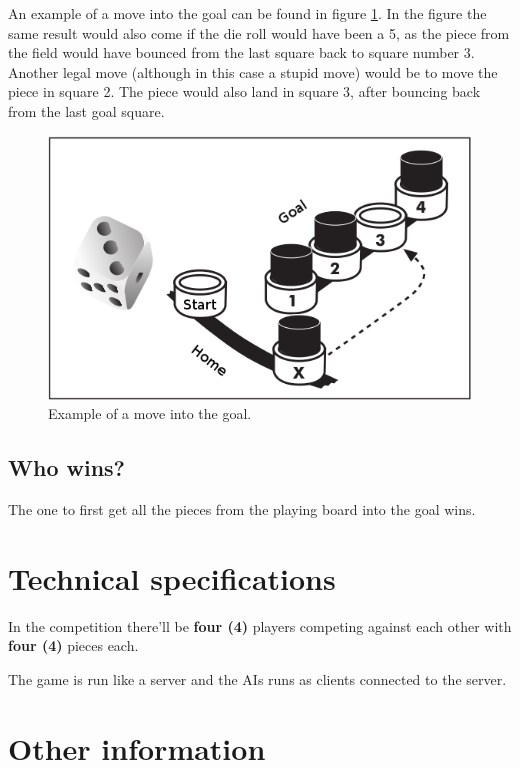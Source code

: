\documentclass[10pt,a4paper]{article}
\begin{document}
An example of a move into the goal can be found in figure \ref{fig:move-goal}. In the figure the same result would also come if the die roll would have been a 5, as the piece from the field would have bounced from the last square back to square number 3. Another legal move (although in this case a stupid move) would be to move the piece in square 2. The piece would also land in square 3, after bouncing back from the last goal square.

\begin{figure}[H]
\begin{center}
\includegraphics[width=.4\linewidth]{move-3.png}
\end{center}
\caption{Example of a move into the goal.}
\label{fig:move-goal}
\end{figure}

\subsection{Who wins?}

The one to first get all the pieces from the playing board into the goal wins.



\section{Technical specifications}
\label{sec:tech-specs}


In the competition there'll be \textbf{four (4)} players competing against each other with \textbf{four (4)} pieces each.

The game is run like a server and the AIs runs as clients connected to the server.



\section{Other information}
\label{sec:other-info}

\end{document}
